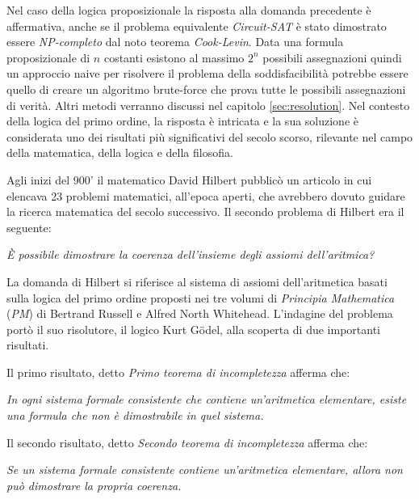 \documentclass[./main.tex]{subfiles}
\begin{document}
Nel caso della logica proposizionale la risposta alla domanda precedente è affermativa, 
anche se il problema equivalente \textit{Circuit-SAT} è stato dimostrato essere \textit{NP-completo} dal noto teorema \textit{Cook-Levin}.
Data una formula proposizionale di $n$ costanti esistono al massimo $2^n$ possibili assegnazioni quindi
un approccio naive per risolvere il problema della soddisfacibilità potrebbe essere quello di creare un algoritmo brute-force 
che prova tutte le possibili assegnazioni di verità. Altri metodi verranno discussi nel capitolo \ref{sec:resolution}.
Nel contesto della logica del primo ordine, 
la risposta è intricata e la sua soluzione è considerata uno dei risultati più significativi del secolo scorso, 
rilevante nel campo della matematica, della logica e della filosofia.


Agli inizi del 900' il matematico David Hilbert pubblicò un articolo in cui elencava 23 problemi matematici, all'epoca aperti,
che avrebbero dovuto guidare la ricerca matematica del secolo successivo. Il secondo problema di Hilbert era il seguente:

\begin{displayquote}
  \textit{È possibile dimostrare la coerenza dell'insieme degli assiomi dell'aritmica?}
\end{displayquote}

La domanda di Hilbert si riferisce al sistema di assiomi dell'aritmetica
basati sulla logica del primo ordine proposti nei tre volumi di \textit{Principia Mathematica} (\textit{PM})
di Bertrand Russell e Alfred North Whitehead.
L'indagine del problema portò il suo risolutore, il logico Kurt Gödel, alla scoperta di due importanti risultati.

Il primo risultato, detto \textit{Primo teorema di incompletezza} afferma che:

\begin{displayquote}
  \textit{In ogni sistema formale consistente che contiene un'aritmetica elementare, esiste una formula che non è dimostrabile in quel sistema.}
\end{displayquote}

Il secondo risultato, detto \textit{Secondo teorema di incompletezza} afferma che:

\begin{displayquote}
  \textit{Se un sistema formale consistente contiene un'aritmetica elementare, allora non può dimostrare la propria coerenza.}
\end{displayquote}
\end{document}
